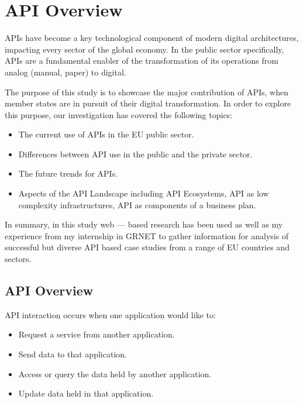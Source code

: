 \section{API Overview} %


APIs have become a key technological component of modern digital
architectures, impacting every sector of the global economy. In the public
sector specifically, APIs are a fundamental enabler of the transformation of its
operations from analog (manual, paper) to digital.

The purpose of this study is to showcase the 
major contribution of APIs, when member states are in
pursuit of their digital transformation.
In order to explore this purpose, our investigation has
covered the following topics:

\begin{itemize}
	\item The current use of APIs in the EU public sector.
	\item Differences between API use in the public and the private sector.
	\item The future trends for APIs.
	\item Aspects of the API Landscape including API Ecosystems, API as low complexity infrastructures,
	API as components of a business plan.
\end{itemize}
                                                                       
In summary, in this study web — based research has been used as well as my
experience from my internship in GRNET to gather information for analysis
of successful but diverse API based case studies from a range of EU countries
and sectors.

\subsection{API Overview}



API interaction occurs when one application would like to:
\begin{itemize}
	\item Request a service from another application.
	\item Send data to that application.
	\item Access or query the data held by another application.
	\item Update data held in that application.

\end{itemize}

